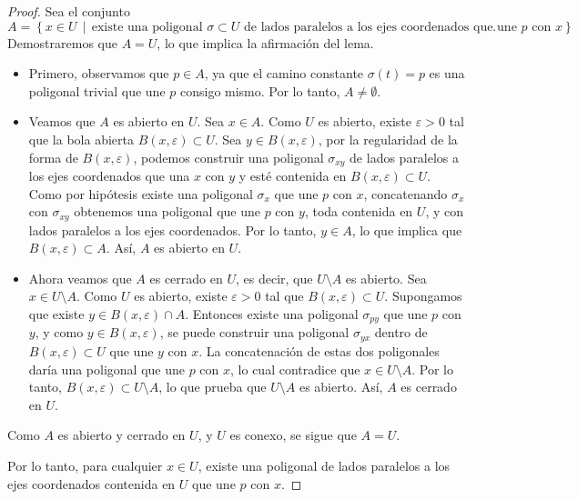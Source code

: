 \begin{proof}
    Sea el conjunto
    \[
    A = \left\{ x \in U \,\middle|\, \text{existe una poligonal } \sigma \subset U \text{ de lados paralelos a los ejes coordenados que une } p \text{ con } x \right\}.
    \]
    Demostraremos que \( A = U \), lo que implica la afirmación del lema.

    \begin{itemize}
        \item Primero, observamos que \( p \in A \), ya que el camino constante \( \sigma(t) = p \) es una poligonal trivial que une \( p \) consigo mismo. Por lo tanto, \( A \neq \emptyset \).
        
        \item Veamos que \( A \) es abierto en \( U \). Sea \( x \in A \). Como \( U \) es abierto, existe \( \varepsilon > 0 \) tal que la bola abierta \( B(x, \varepsilon) \subset U \). Sea \( y \in B(x, \varepsilon) \), por la regularidad de la forma de \(B(x, \varepsilon)\), podemos construir una poligonal \( \sigma_{xy} \) de lados paralelos a los ejes coordenados que una \( x \) con \( y \) y esté contenida en \( B(x, \varepsilon) \subset U \). Como por hipótesis existe una poligonal \( \sigma_{x} \) que une \( p \) con \( x \), concatenando \( \sigma_{x} \) con \( \sigma_{xy} \) obtenemos una poligonal que une \( p \) con \( y \), toda contenida en \( U \), y con lados paralelos a los ejes coordenados. Por lo tanto, \( y \in A \), lo que implica que \( B(x, \varepsilon) \subset A \). Así, \( A \) es abierto en \( U \).

        \item Ahora veamos que \( A \) es cerrado en \( U \), es decir, que \( U \setminus A \) es abierto. Sea \( x \in U \setminus A \). Como \( U \) es abierto, existe \( \varepsilon > 0 \) tal que \( B(x, \varepsilon) \subset U \). Supongamos que existe \( y \in B(x, \varepsilon) \cap A \). Entonces existe una poligonal \( \sigma_{py} \) que une \( p \) con \( y \), y como \( y \in B(x, \varepsilon) \), se puede construir una poligonal \( \sigma_{yx} \) dentro de \( B(x, \varepsilon) \subset U \) que une \( y \) con \( x \). La concatenación de estas dos poligonales daría una poligonal que une \( p \) con \( x \), lo cual contradice que \( x \in U \setminus A \). Por lo tanto, \( B(x, \varepsilon) \subset U \setminus A \), lo que prueba que \( U \setminus A \) es abierto. Así, \( A \) es cerrado en \( U \).
    \end{itemize}

    Como \( A \) es abierto y cerrado en \( U \), y \( U \) es conexo, se sigue que \( A = U \).

    Por lo tanto, para cualquier \( x \in U \), existe una poligonal de lados paralelos a los ejes coordenados contenida en \( U \) que une \( p \) con \( x \).
\end{proof}



